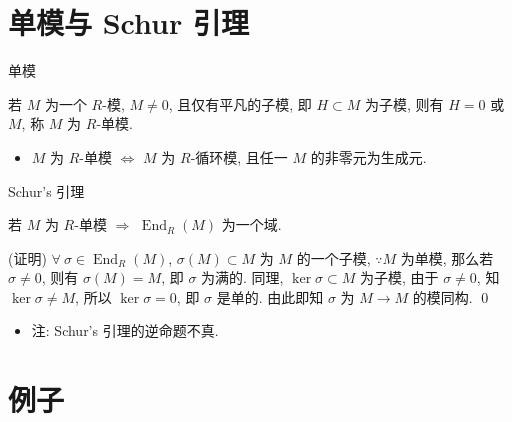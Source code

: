 
\section[单模]{单模与 Schur 引理}


\begin{frame}{单模}

\begin{Def}[单模]
若 $M$ 为一个 $R$-模, $M \neq 0$, 且仅有平凡的子模, 即 $H \subset M$ 为子模,
则有 $H = 0$ 或 $M$, 称 $M$ 为 $R$-单模.
\end{Def}

\pause

\begin{itemize}
\item $M$ 为 $R$-单模 $\iff$ $M$ 为 $R$-循环模, 且任一 $M$ 的非零元为生成元.
\end{itemize}

\end{frame}


\begin{frame}{Schur's 引理}

\begin{lem}[Schur's 引理]
若 $M$ 为 $R$-单模 $\Longrightarrow$ $\operatorname{End}_R(M)$ 为一个域.
\end{lem}

\startproof[bg=yellow, fg=red](证明)
$\forall\ \sigma \in \operatorname{End}_R(M)$, $\sigma(M) \subset M$ 为 $M$
的一个子模, $\because M$ 为单模, 那么若 $\sigma \neq 0$, 则有 $\sigma(M) = M$,
即 $\sigma$ 为满的.
同理, $\ker \sigma \subset M$ 为子模, 由于 $\sigma \neq 0$,
知 $\ker \sigma \neq M$, 所以 $\ker \sigma = 0$, 即 $\sigma$ 是单的.
由此即知 $\sigma$ 为 $M \to M$ 的模同构.
\qed

\pause

\begin{itemize}
\item 注: Schur's 引理的逆命题不真.
\end{itemize}

\end{frame}


\section[例子]{例子}

